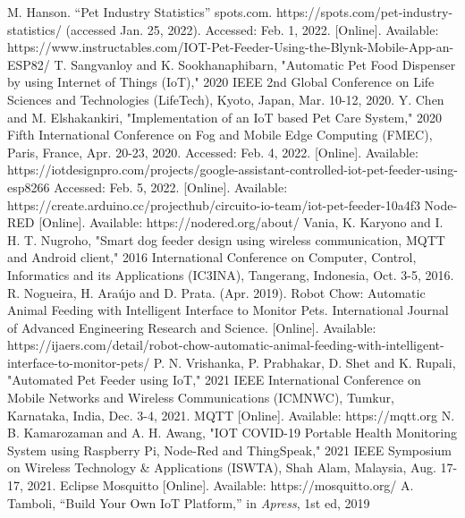\documentclass[conference]{IEEEtran}
\begin{document}
\begin{thebibliography}{00}
M.  Hanson.  “Pet  Industry  Statistics”  spots.com.  https://spots.com/pet-industry-statistics/ (accessed Jan. 25, 2022). 
Accessed: Feb. 1, 2022. [Online]. Available: https://www.instructables.com/IOT-Pet-Feeder-Using-the-Blynk-Mobile-App-an-ESP82/
T. Sangvanloy and K. Sookhanaphibarn, "Automatic Pet Food Dispenser by using Internet of Things (IoT)," 2020 IEEE 2nd Global Conference on Life Sciences and Technologies (LifeTech), Kyoto, Japan, Mar. 10-12, 2020.
Y. Chen and M. Elshakankiri, "Implementation of an IoT based Pet Care System," 2020 Fifth International Conference on Fog and Mobile Edge Computing (FMEC), Paris, France, Apr. 20-23, 2020.
Accessed: Feb. 4, 2022. [Online]. Available: https://iotdesignpro.com/projects/google-assistant-controlled-iot-pet-feeder-using-esp8266
Accessed: Feb. 5, 2022. [Online]. Available: https://create.arduino.cc/projecthub/circuito-io-team/iot-pet-feeder-10a4f3
Node-RED [Online]. Available: https://nodered.org/about/
Vania, K. Karyono and I. H. T. Nugroho, "Smart dog feeder design using wireless communication, MQTT and Android client," 2016 International Conference on Computer, Control, Informatics and its Applications (IC3INA), Tangerang, Indonesia, Oct. 3-5, 2016.
R. Nogueira, H. Araújo and D. Prata. (Apr. 2019). Robot Chow: Automatic Animal Feeding with Intelligent Interface to Monitor Pets. International Journal of Advanced Engineering Research and Science. [Online]. Available: https://ijaers.com/detail/robot-chow-automatic-animal-feeding-with-intelligent-interface-to-monitor-pets/
P. N. Vrishanka, P. Prabhakar, D. Shet and K. Rupali, "Automated Pet Feeder using IoT," 2021 IEEE International Conference on Mobile Networks and Wireless Communications (ICMNWC), Tumkur, Karnataka, India, Dec. 3-4, 2021.
MQTT [Online]. Available: https://mqtt.org
N. B. Kamarozaman and A. H. Awang, "IOT COVID-19 Portable Health Monitoring System using Raspberry Pi, Node-Red and ThingSpeak," 2021 IEEE Symposium on Wireless Technology \& Applications (ISWTA), Shah Alam, Malaysia, Aug. 17-17, 2021.
Eclipse Mosquitto [Online]. Available: https://mosquitto.org/
A. Tamboli, “Build Your Own IoT Platform,” in \textit{Apress}, 1st ed, 2019
\end{thebibliography}

\end{document}
